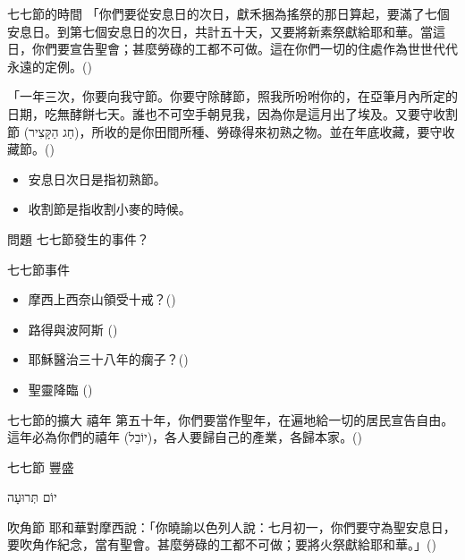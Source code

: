 \documentclass{beamer}
\newcommand{\topic}[1]{
  \begin{frame}
    \centering
    \vspace*{1cm}
    {\fontsize{40}{48}\selectfont #1\par}
    \vfill
  \end{frame}
}
\newcommand{\question}[1]{
  \begin{frame}{問題}
    \centering
    \vspace*{1cm}
    \huge #1？\par
    \vfill
  \end{frame}
}
\newcommand{\conclusion}[2]{
  \begin{frame}
    \centering
    \vspace*{1cm}
    {\fontsize{40}{48}\selectfont #1 \textemdash #2\par}
    \vfill
  \end{frame}
}
\newcommand{\parvspace}{\par\vspace{0.5em}}
\begin{document}
\begin{frame}{七七節的時間}
  「你們要從\alert{安息日的次日}，獻禾捆為搖祭的那日算起，要\alert{滿了七個安息日}。到\alert{第七個安息日的次日，共計五十天}，又要將新素祭獻給耶和華。\textellipsis{}當這日，你們要宣告聖會；\alert{甚麼勞碌的工都不可做}。這在你們一切的住處作為世世代代永遠的定例。()\parvspace
  「一年三次，你要向我守節。你要守除酵節，照我所吩咐你的，在亞筆月內所定的日期，吃無酵餅七天。誰也不可空手朝見我，因為你是這月出了埃及。又要守\alert{收割節 (\texthebrew{חַג הַקָּצִיר})}，所收的是你田間所種、勞碌得來初熟之物。並在年底收藏，要守收藏節。()\parvspace
  \begin{itemize}
    \item 安息日次日是指初熟節。
    \item 收割節是指收割小麥的時候。
  \end{itemize}
\end{frame}

\question{七七節發生的事件}

\begin{frame}{七七節事件}
  \begin{itemize}
    \item 摩西上西奈山領受十戒？()\parencite{TenCommandmentsOnShavuot}
    \item 路得與波阿斯 ()
    \item 耶穌醫治三十八年的瘸子？()
    \item 聖靈降臨 ()
  \end{itemize}
\end{frame}

\begin{frame}{七七節的擴大 \textemdash 禧年}
  第五十年，你們要當作\alert{聖年}，在遍地給一切的居民\alert{宣告自由}。這年必為你們的禧年 (\texthebrew{יוֹבֵל})，各人要\alert{歸自己的產業}，\alert{各歸本家}。()
\end{frame}

\conclusion{七七節}{豐盛}

\topic{\texthebrew{יוֹם תְּרוּעָה}}

\begin{frame}{吹角節}
  耶和華對摩西說：「你曉諭以色列人說：\alert{七月初一}，你們要守為\alert{聖安息日}，要吹角作紀念，當有聖會。甚麼勞碌的工都不可做；要將火祭獻給耶和華。」()\parvspace
\end{frame}
\end{document}
